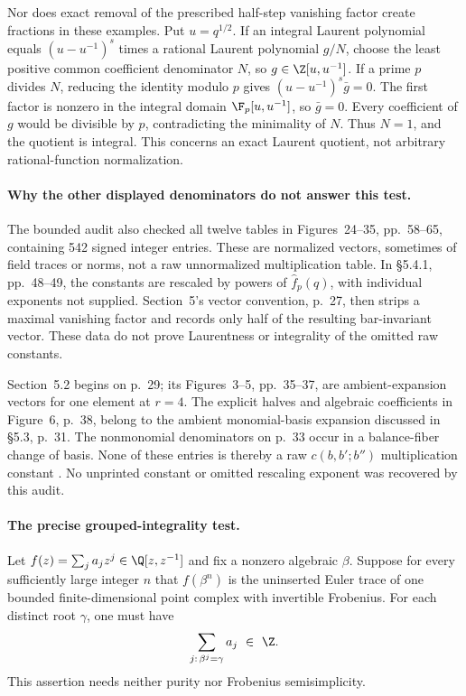 Nor does exact removal of the prescribed
half-step vanishing factor create fractions in
these examples. Put \(u=q^{1/2}\).
If an integral Laurent polynomial equals
\((u-u^{-1})^s\) times a rational Laurent
polynomial \(g/N\), choose the least positive
common coefficient denominator \(N\), so
\(g\in\Z[u,u^{-1}]\).
If a prime \(p\) divides \(N\), reducing the
identity modulo \(p\) gives
\((u-u^{-1})^s\bar g=0\).
The first factor is nonzero in the integral
domain \(\F_p[u,u^{-1}]\), so \(\bar g=0\).
Every coefficient of \(g\) would be divisible
by \(p\), contradicting the minimality of \(N\).
Thus \(N=1\), and the quotient is integral.
This concerns an exact Laurent quotient, not
arbitrary rational-function normalization.

\paragraph{Why the other displayed denominators do not answer this test.}
The bounded audit also checked all twelve
tables in Figures~24--35, pp.~58--65,
containing 542 signed integer entries.
These are normalized vectors, sometimes of
field traces or norms, not a raw unnormalized
multiplication table.
In \S5.4.1, pp.~48--49, the constants are
rescaled by powers of \(\hat f_p(q)\), with
individual exponents not supplied.
Section~5's vector convention, p.~27, then
strips a maximal vanishing factor and records
only half of the resulting bar-invariant vector.
These data do not prove Laurentness or integrality
of the omitted raw constants.

Section~5.2 begins on p.~29; its
Figures~3--5, pp.~35--37, are ambient-expansion
vectors for one element at \(r=4\).
The explicit halves and algebraic coefficients
in Figure~6, p.~38, belong to the ambient
monomial-basis expansion discussed in
\S5.3, p.~31.
The nonmonomial denominators on p.~33 occur
in a balance-fiber change of basis.
None of these entries is thereby a raw
\(c(b,b';b'')\) multiplication constant
\cite{VIII}.
No unprinted constant or omitted rescaling
exponent was recovered by this audit.

\paragraph{The precise grouped-integrality test.}
Let \(f(z)=\sum_j a_jz^j\in\Q[z,z^{-1}]\)
and fix a nonzero algebraic \(\beta\).
Suppose for every sufficiently large integer \(n\)
that \(f(\beta^n)\) is the uninserted Euler
trace of one bounded finite-dimensional point
complex with invertible Frobenius.
For each distinct root \(\gamma\), one must have
\begin{equation}\label{eq:VIIIGroupedIntegerMultiplicity}
       \sum_{j:\,\beta^j=\gamma}a_j\ \in\ \Z.
\end{equation}
This assertion needs neither purity nor
Frobenius semisimplicity.

